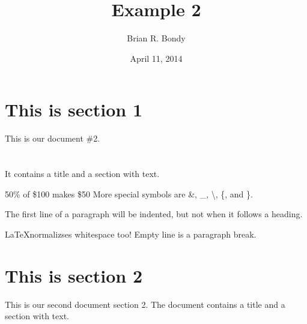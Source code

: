 \documentclass[a4paper,11pt]{article}
\begin{document}
\title{Example 2}
\author{Brian R. Bondy}
\date{April 11, 2014}
\maketitle
\section{This is section 1}


This is our  document \#2. \\\\\\It contains a title and a section with text.

50\% of \$100 makes \$50
More special symbols are \&, \_, \textbackslash, \{, and \}.

The first line of a paragraph will be indented, but not when it follows a heading.

\LaTeX normalizses whitespace        too!
Empty line is a paragraph break.







\section{This is section 2}
This is our second document section 2. The document contains a title and a section with text.
\end{document}
